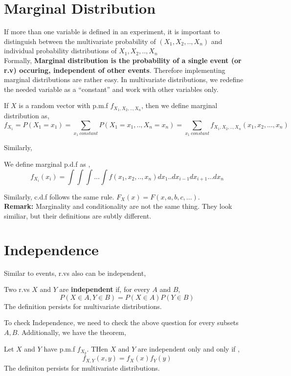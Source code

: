 \section{Marginal Distribution}
If more than one variable is defined in an experiment, it is important to distinguish between the multivariate probability of $(X_1,X_2,..,X_n)$ and individual probability distributions of $X_1,X_2,..,X_n$\\

Formally, \textbf{Marginal distribution is the probability of a single event (or r.v) occuring, independent of other events}. Therefore implementing marginal distributions are rather easy. In multivariate distributions, we redefine the needed variable as a ``constant'' and work with other variables only.
\begin{definition}
    If $X$ is a random vector with p.m.f $f_{X_1,X_2,..,X_n}$, then we define marginal distribution as,
    \[f_{X_1}= P(X_1 = x_1)= \sum_{x_1 \ constant} P(X_1=x_1,..,X_n=x_n)= \sum_{x_1\ constant} f_{X_1,X_2,..,X_n}(x_1,x_2,...,x_n)\]
\end{definition}
Similarly,
\begin{definition}
    We define marginal p.d.f as ,
    \[f_{X_i}(x_i) =  \int \int \int ... \int f(x_1,x_2,..,x_n)dx_1..dx_{i-1}dx_{i+1}...dx_n \]
\end{definition}
Similarly, c.d.f follows the same rule. $F_X(x)= F(x,a,b,c,...)$. \\
\textbf{Remark:} Marginality and conditionality are not the same thing. They look similiar, but their definitions are subtly different.
\par
\section{Independence}
Similar to events, r.vs also can be independent,
\begin{definition}
    Two r.vs $X$ and $Y$ are \textbf{independent} if, for every $A$ and $B$,
    \[P(X \in A, Y \in B)= P(X \in A)P(Y \in B)\]
    The definition persists for multivariate distributions.
\end{definition}
To check Independence, we need to check the above question for every subsets $A,B$. Additionally, we have the theorem,
\begin{theorem}
    Let $X$ and $Y$ have p.m.f $f_{X_y}$. THen $X$ and $Y$ are independent only and only if ,
    \[f_{X,Y}(x,y)=f_X(x)f_Y(y) \]
    The definiton persists for multivariate distributions.
\end{theorem}


